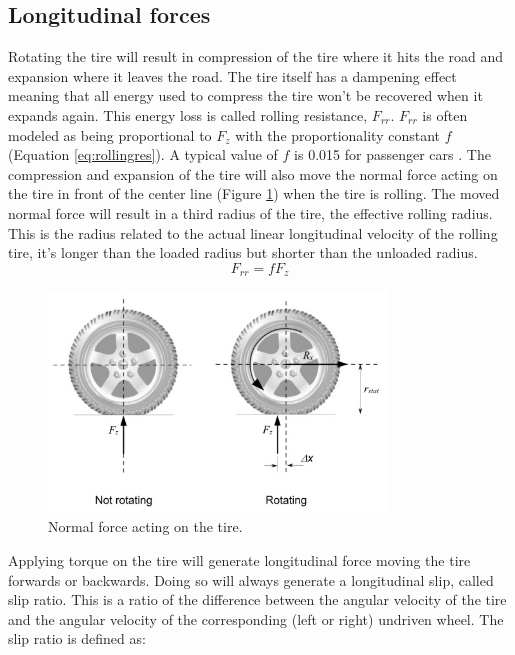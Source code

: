 \subsection{Longitudinal forces}
Rotating the tire will result in compression of the tire where it hits the road and expansion where it leaves the road. The tire itself has a dampening effect meaning that all energy used to compress the tire won't be recovered when it expands again. This energy loss is called rolling resistance, $ F_{rr} $. $ F_{rr} $ is often modeled as being proportional to $ F_{z} $ with the proportionality constant $ f $ (Equation \ref{eq:rollingres}). A typical value of $ f $ is 0.015 for passenger cars \cite{rajamani}. The compression and expansion of the tire will also move the normal force acting on the tire in front of the center line (Figure \ref{rolling_resistance}) when the tire is rolling. The moved normal force will result in a third radius of the tire, the effective rolling radius. This is the radius related to the actual linear longitudinal velocity of the rolling tire, it's longer than the loaded radius but shorter than the unloaded radius.
\begin{equation}
F_{rr} = fF_{z}
\label{eq:rollingres}
\end{equation}
\begin{figure}[h]
	\centering
	\includegraphics[width=0.8\textwidth]{Pictures/rolling_resistance}
	\caption{Normal force acting on the tire. \cite{rajamani}}
	\label{rolling_resistance}
\end{figure}
Applying torque on the tire will generate longitudinal force moving the tire forwards or backwards. Doing so will always generate a longitudinal slip, called slip ratio. This is a ratio of the difference between the angular velocity of the tire and the angular velocity of the corresponding (left or right) undriven wheel. The slip ratio is defined as: 
